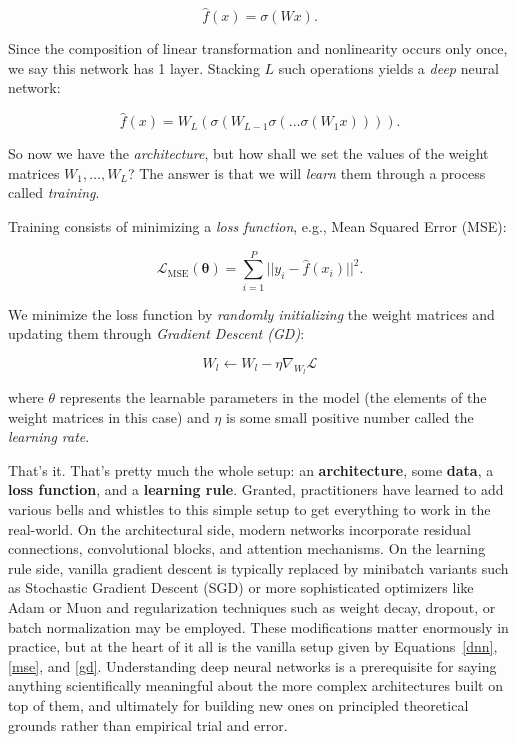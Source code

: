 \begin{equation}
    \hat{f}(x)=\sigma(Wx).
\end{equation}

Since the composition of linear transformation and nonlinearity occurs only once, we say this network has 1 layer. Stacking $L$ such operations yields a \textit{deep} neural network:

\begin{equation}
\hat{f}(x)=W_{L}(\sigma(W_{L-1}\sigma(\dots \sigma(W_{1}x)))).
\label{dnn}
\end{equation}

So now we have the \textit{architecture}, but how shall we set the values of the weight matrices $W_1, \dots,W_L$? The answer is that we will \textit{learn} them through a process called \textit{training}.

Training consists of minimizing a \textit{loss function}, e.g., Mean Squared Error (MSE):

\begin{equation}
\mathcal{L}_{\text{MSE}}(\mathbf{\theta}) = \sum^P_{i=1}||y_{i}-\hat{f}(x_{i})||^2.
\label{mse}
\end{equation}

We minimize the loss function by \textit{randomly initializing} the weight matrices and updating them through \textit{Gradient Descent (GD)}:

\begin{equation}
W_{l} \leftarrow W_{l}-\eta \nabla_{W_{l}} \mathcal{L}
\label{gd}
\end{equation}

where $\theta$ represents the learnable parameters in the model (the elements of the weight matrices in this case) and $\eta$ is some small positive number called the \textit{learning rate}.

That's it. That's pretty much the whole setup: an \textbf{architecture}, some \textbf{data}, a \textbf{loss function}, and a \textbf{learning rule}. Granted, practitioners have learned to add various bells and whistles to this simple setup to get everything to work in the real-world. On the architectural side, modern networks incorporate residual connections, convolutional blocks, and attention mechanisms. On the learning rule side, vanilla gradient descent is typically replaced by minibatch variants such as Stochastic Gradient Descent (SGD) or more sophisticated optimizers like Adam or Muon and regularization techniques such as weight decay, dropout, or batch normalization may be employed. These modifications matter enormously in practice, but at the heart of it all is the vanilla setup given by Equations~\eqref{dnn}, \eqref{mse}, and \eqref{gd}. Understanding deep neural networks is a prerequisite for saying anything scientifically meaningful about the more complex architectures built on top of them, and ultimately for building new ones on principled theoretical grounds rather than empirical trial and error.

